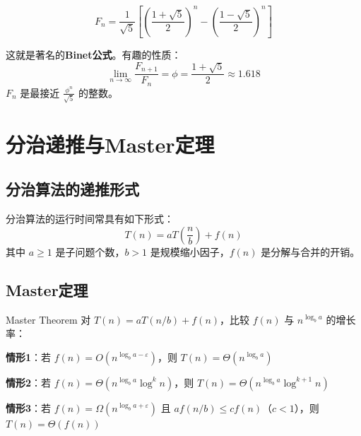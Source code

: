 \begin{myformula}
\[
F_n = \frac{1}{\sqrt{5}}\left[\left(\frac{1+\sqrt{5}}{2}\right)^n - \left(\frac{1-\sqrt{5}}{2}\right)^n\right]
\]
\end{myformula}

这就是著名的\textbf{Binet公式}。有趣的性质：
\[
\lim_{n\to\infty} \frac{F_{n+1}}{F_n} = \phi = \frac{1+\sqrt{5}}{2} \approx 1.618
\]
\(F_n\) 是最接近 \(\frac{\phi^n}{\sqrt{5}}\) 的整数。

\begin{center}
\end{center}

\section{分治递推与Master定理}

\subsection{分治算法的递推形式}

分治算法的运行时间常具有如下形式：
\[
T(n) = aT\!\left(\frac{n}{b}\right) + f(n)
\]
其中 \(a \geq 1\) 是子问题个数，\(b > 1\) 是规模缩小因子，\(f(n)\) 是分解与合并的开销。

\subsection{Master定理}

\begin{myTheorem}{Master Theorem}
对 \(T(n) = aT(n/b) + f(n)\)，比较 \(f(n)\) 与 \(n^{\log_b a}\) 的增长率：

\vspace{4pt}
\textbf{情形1}：若 \(f(n) = O(n^{\log_b a - \varepsilon})\)，则 \(T(n) = \Theta(n^{\log_b a})\)

\textbf{情形2}：若 \(f(n) = \Theta(n^{\log_b a} \log^k n)\)，则 \(T(n) = \Theta(n^{\log_b a} \log^{k+1} n)\)

\textbf{情形3}：若 \(f(n) = \Omega(n^{\log_b a + \varepsilon})\) 且 \(af(n/b) \leqslant cf(n)\)（\(c<1\)），则 \(T(n) = \Theta(f(n))\)
\end{myTheorem}

